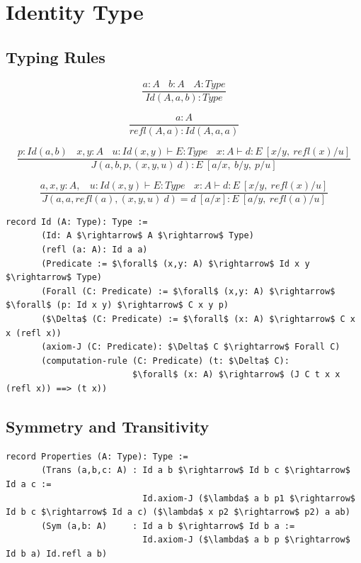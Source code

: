 \documentclass[11pt,oneside]{article}
\begin{document}
\section{Identity Type}

\subsection{Typing Rules}

\begin{equation}
\tag{$Id$-formation}
\dfrac
  {a:A\ \ \ \ b:A\ \ \ \ A:Type}
  {Id(A,a,b) : Type}
\end{equation}

\begin{equation}
\tag{$Id$-intro}
\dfrac
  {a:A}
  {refl(A,a) : Id(A,a,a) }
\end{equation}

\begin{equation}
\tag{$J$-elimination}
\dfrac
  {p:Id(a,b)\ \ \ \ x,y:A\ \ \ \ u:Id(x,y) \vdash E:Type\ \ \ \ x:A \vdash d: E\ [x/y,\ refl(x)/u]}
  {J(a,b,p,(x,y,u)\ d) : E\ [a/x,\ b/y,\ p/u]}
\end{equation}

\begin{equation}
\tag{$Id$-computation}
\dfrac
  {a,x,y:A,\ \ \ \ u:Id(x,y) \vdash E:Type\ \ \ \ x:A \vdash d:E\ [x/y,\ refl(x)/u]}
  {J(a,a,refl(a),(x,y,u)\ d) = d\ [a/x] : E\ [a/y,\ refl(a)/u]}
\end{equation}

\begin{lstlisting}[mathescape=true]
record Id (A: Type): Type :=
       (Id: A $\rightarrow$ A $\rightarrow$ Type)
       (refl (a: A): Id a a)
       (Predicate := $\forall$ (x,y: A) $\rightarrow$ Id x y $\rightarrow$ Type)
       (Forall (C: Predicate) := $\forall$ (x,y: A) $\rightarrow$ $\forall$ (p: Id x y) $\rightarrow$ C x y p)
       ($\Delta$ (C: Predicate) := $\forall$ (x: A) $\rightarrow$ C x x (refl x))
       (axiom-J (C: Predicate): $\Delta$ C $\rightarrow$ Forall C)
       (computation-rule (C: Predicate) (t: $\Delta$ C):
                         $\forall$ (x: A) $\rightarrow$ (J C t x x (refl x)) ==> (t x))
\end{lstlisting}

\newpage
\subsection{Symmetry and Transitivity}

\begin{lstlisting}[mathescape=true]
record Properties (A: Type): Type :=
       (Trans (a,b,c: A) : Id a b $\rightarrow$ Id b c $\rightarrow$ Id a c :=
                           Id.axiom-J ($\lambda$ a b p1 $\rightarrow$ Id b c $\rightarrow$ Id a c) ($\lambda$ x p2 $\rightarrow$ p2) a ab)
       (Sym (a,b: A)     : Id a b $\rightarrow$ Id b a :=
                           Id.axiom-J ($\lambda$ a b p $\rightarrow$ Id b a) Id.refl a b)
\end{lstlisting}
\end{document}
